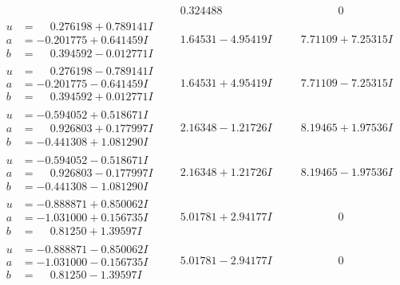 \documentclass[1p]{elsarticle_modified}
\theoremstyle{definition}
\begin{document}
$$\begin{array}{c|c|c}
 & \phantom{-}0.324488\phantom{ +0.000000I} & \phantom{-0.000000 } 0 \\ \hline\begin{aligned}
u &= \phantom{-}0.276198 + 0.789141 I \\
a &= -0.201775 + 0.641459 I \\
b &= \phantom{-}0.394592 - 0.012771 I\end{aligned}
 & \phantom{-}1.64531 - 4.95419 I & \phantom{-}7.71109 + 7.25315 I \\ \hline\begin{aligned}
u &= \phantom{-}0.276198 - 0.789141 I \\
a &= -0.201775 - 0.641459 I \\
b &= \phantom{-}0.394592 + 0.012771 I\end{aligned}
 & \phantom{-}1.64531 + 4.95419 I & \phantom{-}7.71109 - 7.25315 I \\ \hline\begin{aligned}
u &= -0.594052 + 0.518671 I \\
a &= \phantom{-}0.926803 + 0.177997 I \\
b &= -0.441308 + 1.081290 I\end{aligned}
 & \phantom{-}2.16348 - 1.21726 I & \phantom{-}8.19465 + 1.97536 I \\ \hline\begin{aligned}
u &= -0.594052 - 0.518671 I \\
a &= \phantom{-}0.926803 - 0.177997 I \\
b &= -0.441308 - 1.081290 I\end{aligned}
 & \phantom{-}2.16348 + 1.21726 I & \phantom{-}8.19465 - 1.97536 I \\ \hline\begin{aligned}
u &= -0.888871 + 0.850062 I \\
a &= -1.031000 + 0.156735 I \\
b &= \phantom{-}0.81250 + 1.39597 I\end{aligned}
 & \phantom{-}5.01781 + 2.94177 I & \phantom{-0.000000 } 0 \\ \hline\begin{aligned}
u &= -0.888871 - 0.850062 I \\
a &= -1.031000 - 0.156735 I \\
b &= \phantom{-}0.81250 - 1.39597 I\end{aligned}
 & \phantom{-}5.01781 - 2.94177 I & \phantom{-0.000000 } 0 \\ \hline\begin{aligned}

\end{aligned}
\end{array}$$
\end{document}

